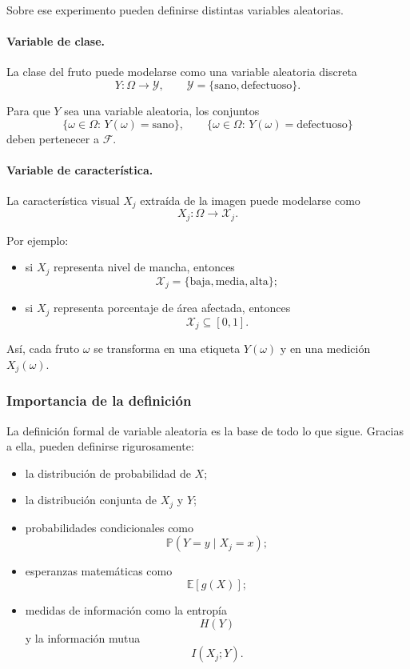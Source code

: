 \documentclass{article}
\begin{document}
Sobre ese experimento pueden definirse distintas variables aleatorias.

\paragraph{Variable de clase.}
La clase del fruto puede modelarse como una variable aleatoria discreta
\[
Y:\Omega \to \mathcal{Y},
\qquad
\mathcal{Y}=\{\text{sano},\text{defectuoso}\}.
\]

Para que \(Y\) sea una variable aleatoria, los conjuntos
\[
\{\omega\in\Omega:\, Y(\omega)=\text{sano}\},
\qquad
\{\omega\in\Omega:\, Y(\omega)=\text{defectuoso}\}
\]
deben pertenecer a \(\mathcal{F}\).

\paragraph{Variable de característica.}
La característica visual \(X_j\) extraída de la imagen puede modelarse como
\[
X_j:\Omega \to \mathcal{X}_j.
\]

Por ejemplo:

\begin{itemize}
\item si \(X_j\) representa nivel de mancha, entonces
\[
\mathcal{X}_j=\{\text{baja},\text{media},\text{alta}\};
\]
\item si \(X_j\) representa porcentaje de área afectada, entonces
\[
\mathcal{X}_j\subseteq [0,1].
\]
\end{itemize}

Así, cada fruto \(\omega\) se transforma en una etiqueta \(Y(\omega)\) y en una medición \(X_j(\omega)\).

\subsubsection*{Importancia de la definición}

La definición formal de variable aleatoria es la base de todo lo que sigue. Gracias a ella, pueden definirse rigurosamente:

\begin{itemize}
\item la distribución de probabilidad de \(X\);
\item la distribución conjunta de \(X_j\) y \(Y\);
\item probabilidades condicionales como
\[
\mathbb{P}(Y=y\mid X_j=x);
\]
\item esperanzas matemáticas como
\[
\mathbb{E}[g(X)];
\]
\item medidas de información como la entropía
\[
H(Y)
\]
y la información mutua
\[
I(X_j;Y).
\]
\end{itemize}
\end{document}
